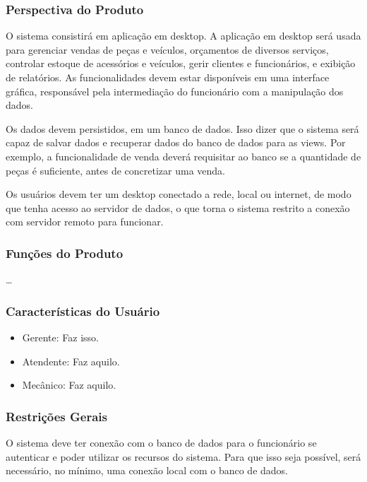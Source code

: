 	\subsubsection{Perspectiva do Produto}
	\par
	O sistema consistirá em aplicação em desktop. A aplicação em desktop será usada para gerenciar vendas de peças e veículos, orçamentos de diversos serviços,  controlar estoque de acessórios e veículos, gerir clientes e funcionários, e exibição de relatórios. As funcionalidades devem estar disponíveis em uma interface gráfica, responsável pela intermediação do funcionário com a manipulação dos dados. 
	\par
	Os dados devem persistidos, em um banco de dados. Isso dizer que o sistema será capaz de salvar dados e recuperar dados do banco de dados para as views. Por exemplo, a funcionalidade de venda deverá requisitar ao banco se a quantidade de peças é suficiente, antes de concretizar uma venda.
	\par
	Os usuários devem ter um desktop conectado a rede, local ou internet, de modo que tenha acesso ao servidor de dados, o que torna o sistema restrito a conexão com servidor remoto para funcionar.
	
	\subsubsection{Funções do Produto}
	\ldots
	
	\subsubsection{Características do Usuário}
	
	\begin{itemize}
	\item[] Gerente: Faz isso.
	\item[] Atendente: Faz aquilo.
	\item[] Mecânico: Faz aquilo.
	\end{itemize}

	\subsubsection{Restrições Gerais}
	\par
	O sistema deve ter conexão com o banco de dados para o funcionário se autenticar e poder utilizar os recursos do sistema. Para que isso seja possível, será necessário, no mínimo, uma conexão local com o banco de dados.
	
